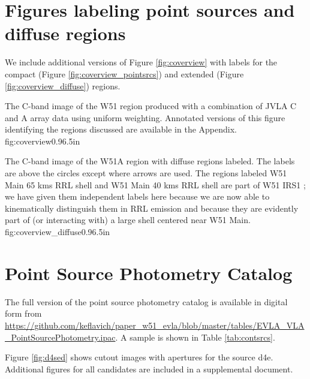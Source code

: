

\appendix
\section{Figures labeling point sources and diffuse regions}
\label{sec:appendix_labels}
We include additional versions of Figure \ref{fig:coverview} with labels for
the compact (Figure \ref{fig:coverview_pointsrcs}) and extended (Figure
\ref{fig:coverview_diffuse}) \hii regions.

{The C-band image of the W51 region produced with a combination of JVLA
C and A array data using uniform weighting.  Annotated versions of this figure
identifying the regions discussed are available in the Appendix.}
{fig:coverview}{0.9}{6.5in}


{The C-band image of the W51A region with diffuse \hii regions labeled.  The labels
are above the circles except where arrows are used.  The regions labeled
{W51 Main 65 kms RRL shell} and {W51 Main 40 kms RRL shell} are part of  W51
IRS1 \citep[e.g.,][]{Zhang1997a}; we have given them independent labels here
because we are now able to kinematically
distinguish them in RRL emission and because they are evidently part of (or
interacting with) a large shell centered near W51 Main.}
{fig:coverview_diffuse}{0.9}{6.5in}

\onecolumn

\twocolumn

\clearpage
\section{Point Source Photometry Catalog}
\label{sec:SEDs}
The full version of the point source photometry catalog is available in digital
form from
\url{https://github.com/keflavich/paper_w51_evla/blob/master/tables/EVLA_VLA_PointSourcePhotometry.ipac}.
A sample is shown in Table \ref{tab:contsrcs}.


Figure \ref{fig:d4sed} shows cutout images with apertures for the source d4e.
Additional figures for all candidates are included in a supplemental document.

